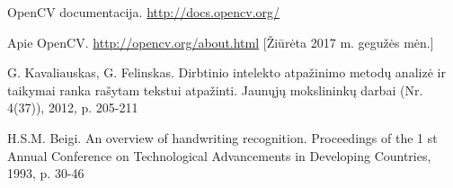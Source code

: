 \documentclass[a4paper,12pt]{article}
\begin{document}
\newpage
\renewcommand{\refname}{Literatūra}
\begin{thebibliography}{99}

OpenCV documentacija. 
\url{http://docs.opencv.org/}

Apie OpenCV.
\url{http://opencv.org/about.html}
[Žiūrėta 2017 m. gegužės mėn.]

G.  Kavaliauskas, G. Felinskas. Dirbtinio intelekto atpažinimo metodų analizė ir taikymai ranka rašytam tekstui atpažinti. Jaunųjų mokslininkų darbai  (Nr. 4(37)), 2012, p. 205-211

H.S.M. Beigi.  An overview of handwriting recognition. Proceedings of the 1 st Annual Conference on Technological Advancements in Developing Countries, 1993, p. 30-46

\end{thebibliography}
\end{document}
